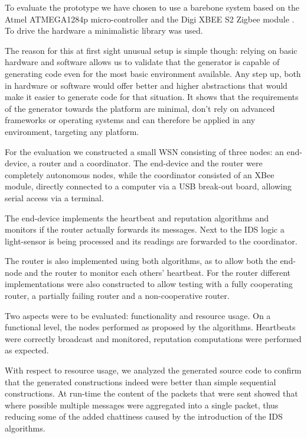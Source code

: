 \documentclass[conference]{IEEEtran}
\begin{document}
To evaluate the prototype we have chosen to use a barebone system based on the
Atmel ATMEGA1284p micro-controller \cite{datasheet:atmega1284p} and the Digi
XBEE S2 Zigbee module \cite{datasheet:xbee}. To drive the hardware a
minimalistic library was used.

The reason for this at first sight unusual setup is simple though: relying on
basic hardware and software allows us to validate that the generator is capable
of generating code even for the most basic environment available. Any step up,
both in hardware or software would offer better and higher abstractions that
would make it easier to generate code for that situation. It shows that the
requirements of the generator towards the platform are minimal, don't rely on
advanced frameworks or operating systems and can therefore be applied in any
environment, targeting any platform.

For the evaluation we constructed a small WSN consisting of three nodes: an
end-device, a router and a coordinator. The end-device and the router were
completely autonomous nodes, while the coordinator consisted of an XBee module,
directly connected to a computer via a USB break-out board, allowing serial
access via a terminal.

The end-device implements the heartbeat and reputation algorithms and monitors
if the router actually forwards its messages. Next to the IDS logic a
light-sensor is being processed and its readings are forwarded to the
coordinator.

The router is also implemented using both algorithms, as to allow both the
end-node and the router to monitor each others' heartbeat. For the router
different implementations were also constructed to allow testing with a fully
cooperating router, a partially failing router and a non-cooperative router.

Two aspects were to be evaluated: functionality and resource usage. On a
functional level, the nodes performed as proposed by the algorithms. Heartbeats
were correctly broadcast and monitored, reputation computations were performed
as expected.

With respect to resource usage, we analyzed the generated source code to
confirm that the generated constructions indeed were better than simple
sequential constructions. At run-time the content of the packets that were sent
showed that where possible multiple messages were aggregated into a single
packet, thus reducing some of the added chattiness caused by the introduction
of the IDS algorithms.
\end{document}
